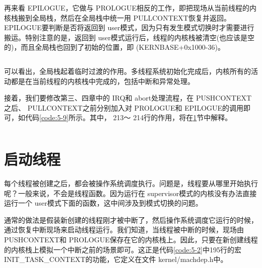 \documentclass[main.tex]{subfiles}
\begin{document}
\begin{CJK*}{UTF8}{song}
\par
再来看 EPILOGUE，它做与 PROLOGUE相反的工作，即把现场从当前线程的内核栈搬到全局栈，然后在全局栈中统一用 PULL\-CONTEXT恢复并返回。 EPILOGUE要判断是否将返回到 user模式，因为只有发生模式切换时才需要进行搬运。特别注意的是，返回到 user模式运行后，线程的内核栈被清空(也应该是空的)，而且全局栈也回到了初始的位置，即 (KERN\-BASE+0x1000-36)。

\begin{code}
\label{code:5-8}
\inputminted[firstline=99,lastline=122,linenos,numbersep=5pt,frame=lines,framesep=2mm]{gas}{src/chapter05/kernel/entry.S}
\end{code}

\par
可以看出，全局栈起着临时过渡的作用。多线程系统初始化完成后，内核所有的活动都是在当前线程的内核栈中完成的，包括中断和异常处理。

\par
接着，我们要修改第三、四章中的 IRQ和 abort处理流程，在 PUSH\-CONTEXT之后、  PULL\-CONTEXT之前分别加入对 PROLOGUE和 EPILOGUE的调用即可，如代码\ref{code:5-9}所示。其中， 213～ 214行的作用，将在\ref{section:start-thread}节中解释。

\begin{code}
\label{code:5-9}
\inputminted[firstline=201,lastline=243,linenos,numbersep=5pt,frame=lines,framesep=2mm]{gas}{src/chapter05/kernel/entry.S}
\end{code}

\section{启动线程}
\label{section:start-thread}
每个线程被创建之后，都会被操作系统调度执行。问题是，线程要从哪里开始执行呢？一般来说，不会是线程函数。因为运行在 supervisor模式的内核没有办法直接运行一个 user模式下面的函数，这中间涉及到模式切换的问题。

\par
通常的做法是假装新创建的线程刚才被中断了，然后操作系统调度它运行的时候，通过恢复中断现场来启动线程运行。我们知道，当线程被中断的时候，现场由 PUSH\-CONTEXT和 PROLOGUE保存在它的内核栈上。因此，只要在新创建线程的内核栈上模拟一个中断之前的场景即可。这正是代码\ref{code:5-2}中195行的宏 INIT\_\-TASK\_\-CONTEXT的功能，它定义在文件 kernel\-/\-machdep.h中。

\begin{code}
\label{code:5-10}
\inputminted[firstline=47,lastline=73,linenos,numbersep=5pt,frame=lines,framesep=2mm]{c}{src/chapter05/kernel/machdep.h}
\end{code}


\end{CJK*}
\end{document}
